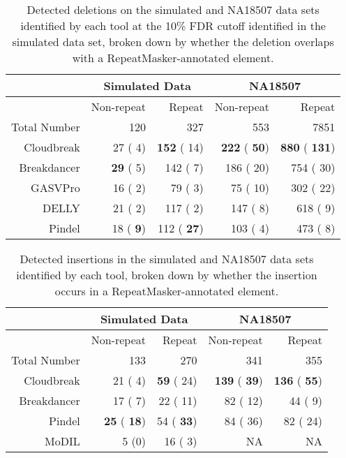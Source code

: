 \documentclass[11pt]{article}
\begin{document}
\begin{table}[b]
\begin{center}
\begin{tabular}{rrr|rr}
 & \multicolumn{2}{c}{Simulated Data} & \multicolumn{2}{c}{NA18507} \\
\hline
 &  Non-repeat & Repeat  &  Non-repeat & Repeat \\ 
 Total Number & 120 & 327 & 553 & 7851 \\ 
  \hline
  Cloudbreak  &   27 (   4) & \textbf{ 152} (  14) & \textbf{ 222} (\textbf{  50}) & \textbf{ 880} (\textbf{ 131}) \\ 
  Breakdancer & \textbf{  29} (   5) &  142 (   7) &  186 (  20) &  754 (  30) \\
  GASVPro     &   16 (   2) &   79 (   3) &   75 (  10) &  302 (  22) \\
  DELLY       &   21 (   2) &  117 (   2) &  147 (   8) &  618 (   9) \\
  Pindel      &   18 (\textbf{   9}) &  112 (\textbf{  27}) &  103 (   4) &  473 (   8) \\ 
   \hline
\end{tabular}
\end{center}
\caption{Detected deletions on the simulated and NA18507 data sets identified by each tool at the 10\% FDR cutoff identified in the simulated data set, broken down by whether the deletion overlaps with a RepeatMasker-annotated element.}
\label{deletionRepmaskpreds}
\end{table}

\begin{table}[b]
\begin{center}
\begin{tabular}{rrr|rr}
 & \multicolumn{2}{c}{Simulated Data} & \multicolumn{2}{c}{NA18507} \\
\hline
 &  Non-repeat & Repeat  &  Non-repeat & Repeat \\ 
 Total Number & 133 & 270 & 341 & 355 \\ 
  \hline
  Cloudbreak  &   21 (   4) & \textbf{  59} (  24) & \textbf{ 139} (\textbf{  39}) & \textbf{ 136} (\textbf{  55}) \\ 
  Breakdancer &   17 (   7) &   22 (  11) &   82 (  12) &   44 (   9) \\
  Pindel      & \textbf{  25} (\textbf{  18}) &   54 (\textbf{  33}) &   84 (  36) &   82 (  24) \\ 
  MoDIL      &    5 (0) &   16 (   3) & NA & NA \\ 
   \hline
\end{tabular}
\end{center}
\caption{Detected insertions in the simulated and NA18507 data sets identified by each tool, broken down by whether the insertion occurs in a RepeatMasker-annotated element.}
\label{insertionRepmaskpreds}
\end{table}
\end{document}
